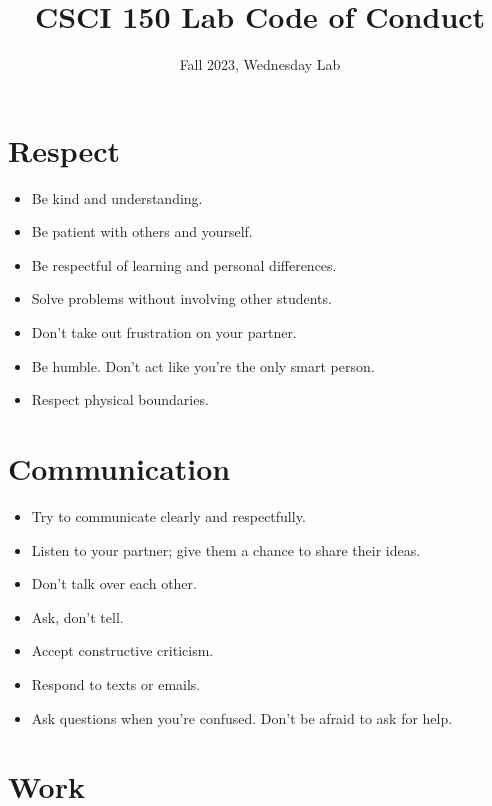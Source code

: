 \documentclass{tufte-handout}
\title{CSCI 150 Lab Code of Conduct}
\date{Fall 2023, Wednesday Lab}
\begin{document}
\maketitle

\section{Respect}

\begin{itemize}
\item Be kind and understanding.
\item Be patient with others and yourself.
\item Be respectful of learning and personal differences.
\item Solve problems without involving other students.
\item Don't take out frustration on your partner.
\item Be humble. Don't act like you're the only smart person.
\item Respect physical boundaries.
\end{itemize}

\section{Communication}

\begin{itemize}
\item Try to communicate clearly and respectfully.
\item Listen to your partner; give them a chance to share their ideas.
\item Don't talk over each other.
\item Ask, don't tell.
\item Accept constructive criticism.
\item Respond to texts or emails.
\item Ask questions when you're confused.  Don't be afraid to ask for
  help.
\end{itemize}

\section{Work}
\end{document}
